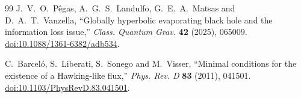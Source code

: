 \documentclass[11pt,a4paper]{article}
\theoremstyle{definition}
\theoremstyle{remark}
\begin{document}
\begin{thebibliography}{99}
		J.~V.~O.~P\^egas, A.~G.~S.~Landulfo, G.~E.~A.~Matsas and D.~A.~T.~Vanzella,
		``Globally hyperbolic evaporating black hole and the information loss issue,''
		\emph{Class. Quantum Grav.} \textbf{42} (2025), 065009.
		\href{https://doi.org/10.1088/1361-6382/adb534}%
		{doi:10.1088/1361-6382/adb534}.
		
		C.~Barcel\'o, S.~Liberati, S.~Sonego and M.~Visser,
		``Minimal conditions for the existence of a Hawking-like flux,''
		\emph{Phys. Rev. D} \textbf{83} (2011), 041501.
		\href{https://doi.org/10.1103/PhysRevD.83.041501}{doi:10.1103/PhysRevD.83.041501}.
		
	\end{thebibliography}
	
\end{document}
